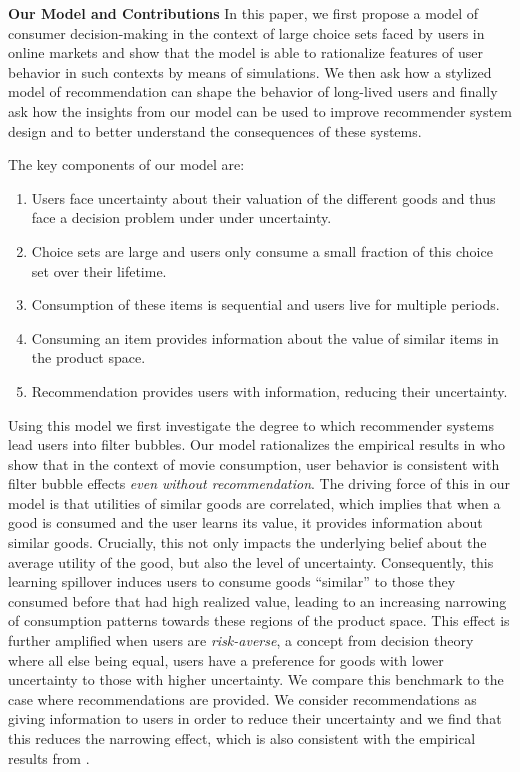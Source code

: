 \documentclass[sigconf]{acmart}
\begin{document}
\textbf{Our Model and Contributions} In this paper, 
we first propose a model of consumer decision-making in the context of large choice sets faced by users in online markets and show that the model is able to rationalize features of user behavior in such contexts by means of simulations. 
We then ask how a stylized model of recommendation can shape the behavior of long-lived users
and finally ask how the insights from our model can be used to improve recommender system design and to better understand the consequences of these systems.
\par

The key components of our model are:
\begin{enumerate}[label=(\arabic*)]
\item Users face uncertainty about their valuation of the different goods and thus face a decision problem under under uncertainty.
\item Choice sets are large and users only consume a small fraction of this choice set over their lifetime.
\item Consumption of these items is sequential and users live for multiple periods.
\item Consuming an item provides information about the value of similar items in the product space.
\item Recommendation provides users with information, reducing their uncertainty.
\end{enumerate}

Using this model we first investigate the degree to which recommender systems lead users into filter bubbles. Our model rationalizes the empirical results in \cite{nguyen2014exploring} who show that in the context of movie consumption, user behavior is consistent with filter bubble effects \textit{even without recommendation}. The driving force of this in our model is that utilities of similar goods are correlated, which implies that when a good is consumed and the user learns its value, it provides information about similar goods. Crucially, this not only impacts the underlying belief about the average utility of the good, but also the level of uncertainty. Consequently, this learning spillover induces users to consume goods ``similar'' to those they consumed before that had high realized value, leading to an increasing narrowing of consumption patterns towards these regions of the product space. This effect is further amplified when users are \textit{risk-averse}, a concept from decision theory where all else being equal, users have a preference for goods with lower uncertainty to those with higher uncertainty.
We compare this benchmark to the case where recommendations are provided. We consider recommendations as giving information to users in order to reduce their uncertainty and we find that this reduces the narrowing effect, which is also consistent with the empirical results from \cite{nguyen2014exploring}.
\par
\end{document}
